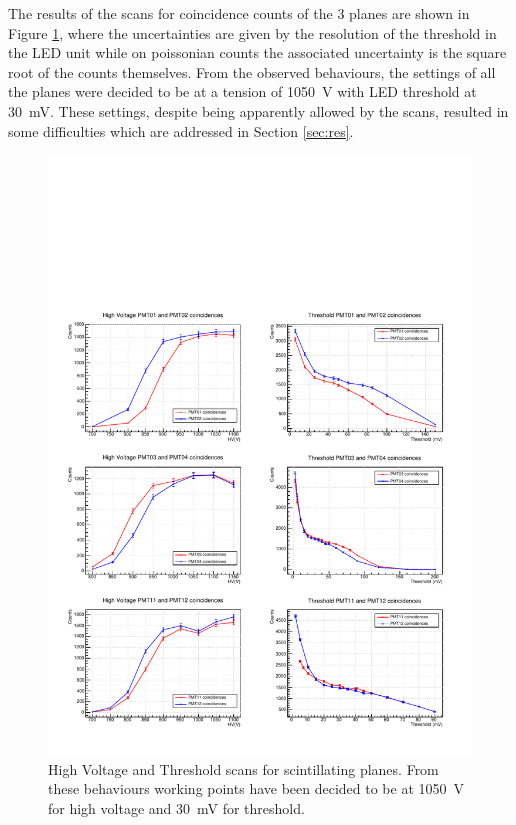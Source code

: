 \documentclass[../main.tex]{subfiles}
\begin{document}
The results of the scans for coincidence counts of the 3 planes are shown in Figure \ref{fig:hvthr}, where the uncertainties are given by the resolution of the threshold in the LED unit while on poissonian counts the associated uncertainty is the square root of the counts themselves. From the observed behaviours, the settings of all the planes were decided to be at a tension of \SI{1050}{\volt} with LED threshold at \SI{30}{\milli \volt}. These settings, despite being apparently allowed by the scans, resulted in some difficulties which are addressed in Section \ref{sec:res}.

\begin{figure}[htb!]
    \centering
    \includegraphics[width = \linewidth]{images/hv-thr.pdf}
    \caption[High Voltage and Threshold scans for scintillating planes]{High Voltage and Threshold scans for scintillating planes. From these behaviours working points have been decided to be at \SI{1050}{\volt} for high voltage and \SI{30}{\milli \volt} for threshold.}
    \label{fig:hvthr}
\end{figure}
\end{document}
